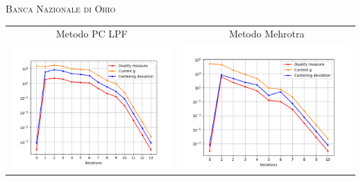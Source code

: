 \begin{frame}{\textsc{\LARGE \textcolor{iris}{Banca Nazionale di Ohio}}}
	\centering
	\begin{tabular}{c@{}c}
		\small{Metodo PC LPF} & \small{Metodo Mehrotra} \\
		\includegraphics[scale = 0.33]{onb_MER2}
		&\includegraphics[scale = 0.33]{onb_MER}\\ 
	\end{tabular}
\end{frame}


